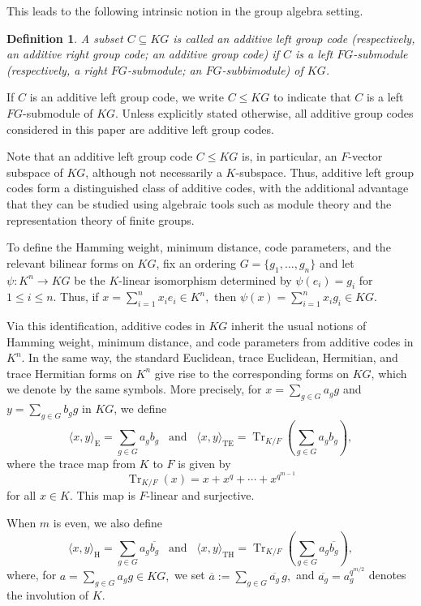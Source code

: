 \documentclass[11pt]{article}
\newtheorem{definition}[theorem]{Definition}
\begin{document}
This leads to the following intrinsic notion in the group algebra setting.


\begin{definition}
A subset $C\subseteq KG$ is called an \emph{additive left group code}
(respectively, an \emph{additive right group code}; an \emph{additive
group code}) if $C$ is a left $FG$-submodule (respectively, a right
$FG$-submodule; an $FG$-subbimodule) of $KG$.
\end{definition}

If $C$ is an additive left group code, we write $C\leq KG$ to indicate that
$C$ is a left $FG$-submodule of $KG$. Unless explicitly stated otherwise,
all additive group codes considered in this paper are additive left group
codes.

Note that an additive left group code $C \leq KG$ is, in particular, an $F$-vector subspace of $KG$, although not necessarily a $K$-subspace. Thus, additive left group codes form a distinguished class of additive codes, with the additional advantage that they can be studied using algebraic tools such as module theory and the representation theory of finite groups.

To define the Hamming weight, minimum distance, code parameters, and the relevant bilinear forms on $KG$, fix an ordering
$
G=\{g_1,\dots,g_n\}
$
and let
$
\psi:K^n\to KG
$
be the $K$-linear isomorphism determined by
$
\psi(e_i)=g_i
$
for $1\leq i\leq n$. Thus, if
$
x=\sum_{i=1}^n x_i e_i\in K^n,
$
then
$
\psi(x)=\sum_{i=1}^n x_i g_i\in KG.
$

Via this identification, additive codes in $KG$ inherit the usual notions of Hamming weight, minimum distance, and code parameters from additive codes in $K^n$. In the same way, the standard Euclidean, trace Euclidean, Hermitian, and trace Hermitian forms on $K^n$ give rise to the corresponding forms on $KG$, which we denote by the same symbols. More precisely, for $x=\sum_{g\in G} a_g g$ and $y=\sum_{g\in G} b_g g$ in $KG$, we define
$$
\langle x,y\rangle_{\mathrm{E}}=\sum_{g\in G} a_g b_g
\;\;\; \textrm{and} \;\;\;
\langle x,y\rangle_{\mathrm{TE}}=\operatorname{Tr}_{K/F}\!\left(\sum_{g\in G} a_g b_g\right),
$$
where the trace map from $K$ to $F$ is given by
$$
\operatorname{Tr}_{K/F}(x)=x+x^q+\cdots+x^{q^{m-1}}
$$
for all $x\in K$. This map is $F$-linear and surjective.

When $m$ is even, we also define
$$
\langle x,y\rangle_{\mathrm{H}}=\sum_{g\in G} a_g \overline{b_g} \;\;\; \textrm{and} \;\;\;
\langle x,y\rangle_{\mathrm{TH}}=\operatorname{Tr}_{K/F}\!\left(\sum_{g\in G} a_g \overline{b_g}\right),
$$
where, for
$
a=\sum_{g\in G} a_g g\in KG,
$
we set
$
\overline{a}:=\sum_{g\in G} \overline{a_g}\,g,
$
and $\overline{a_g}=a_g^{q^{m/2}}$ denotes the involution of $K$.
\end{document}
